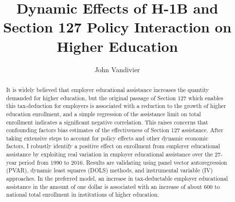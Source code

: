 \documentclass[review]{elsarticle}
\begin{document}
\begin{frontmatter}

\title{
    Dynamic Effects of H-1B and Section 127 Policy Interaction on Higher Education
}

\author[mymainaddress]{John Vandivier} %
\address[mymainaddress]{4400 University Dr, Fairfax, VA 22030}

\begin{abstract}
    It is widely believed that employer educational assistance increases the quantity demanded for higher education,
    but the original passage of Section 127 which enables this tax-deduction for employers is associated with a reduction to the growth of higher education enrollment,
    and a simple regression of the assistance limit on total enrollment indicates a significant negative correlation. %
    This raises concerns that confounding factors bias estimates of the effectiveness of Section 127 assistance.
    After taking extensive steps to account for policy effects and other dynamic economic factors,
    I robustly identify a positive effect on enrollment from employer educational assistance
    by exploiting real variation in employer educational assistance over the 27-year period from 1990 to 2016.
    Results are validating using panel vector autoregression (PVAR),
    dynamic least squares (DOLS) methods,
    and instrumental variable (IV) approaches.
    In the preferred model,
    an increase in tax-deductable employer educational assistance
    in the amount of one dollar is associated with
    an increase of about 600 to national total enrollment in institutions of higher education.



\end{abstract}
\end{frontmatter}
\end{document}
